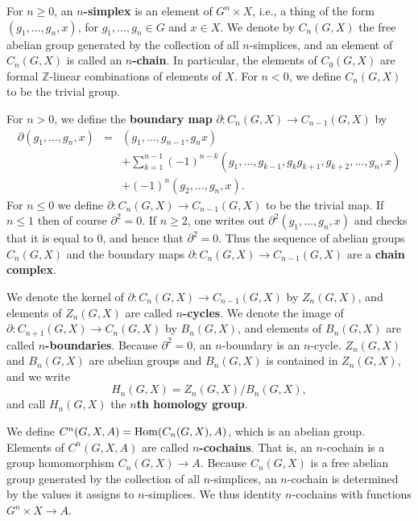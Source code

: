 \documentclass{article}
\newcommand{\Hom}{\ensuremath\mathrm{Hom}}
\theoremstyle{definition}
\begin{document}
For $n \geq 0$, an \textbf{$n$-simplex}
is an element of $G^n \times X$, i.e., 
a thing of the form $(g_1,\ldots,g_n,x)$, for $g_1,\ldots,g_n \in G$ and $x \in X$. 
We denote by $C_n(G,X)$  the free abelian group generated by the collection of all $n$-simplices, and an element of $C_n(G,X)$ is called an
\textbf{$n$-chain}.
In particular, the elements of $C_0(G,X)$ are formal $\mathbb{Z}$-linear combinations of elements 
of
$X$. For $n<0$, we define $C_n(G,X)$ to be the trivial group.

For $n>0$, we define the \textbf{boundary map} $\partial:C_n(G,X) \to C_{n-1}(G,X)$ by
\begin{eqnarray*}
\partial (g_1,\ldots,g_n,x) &=& (g_1,\ldots,g_{n-1},g_n x)\\
&&
+\sum_{k=1}^{n-1} (-1)^{n-k} (g_1,\ldots,g_{k-1},g_k g_{k+1},g_{k+2},\ldots,g_n,x)\\
&&+(-1)^n (g_2,\ldots,g_n,x).
\end{eqnarray*}
For $n \leq 0$ we define $\partial:C_n(G,X) \to C_{n-1}(G,X)$ to be the trivial map. If $n \leq 1$ then 
of course $\partial^2=0$. If $n \geq 2$,
 one writes out $\partial^2 (g_1,\ldots,g_n,x)$ and checks that it is equal to $0$, and hence that $\partial^2=0$.
Thus the sequence of abelian groups $C_n(G,X)$ and the boundary maps 
$\partial:C_n(G,X) \to C_{n-1}(G,X)$ are a \textbf{chain complex}. 

We denote the kernel of $\partial:C_n(G,X) \to C_{n-1}(G,X)$ by $Z_n(G,X)$, and elements of
$Z_n(G,X)$ are called \textbf{$n$-cycles}. We denote the image of $\partial:C_{n+1}(G,X) \to C_n(G,X)$
by $B_n(G,X)$, and elements of $B_n(G,X)$ are called \textbf{$n$-boundaries}. Because
$\partial^2=0$, an $n$-boundary is an $n$-cycle. 
$Z_n(G,X)$ and $B_n(G,X)$ are abelian groups and $B_n(G,X)$ is contained in $Z_n(G,X)$, and we write
\[
H_n(G,X) = Z_n(G,X) / B_n(G,X),
\]
and call $H_n(G,X)$ the \textbf{$n$th homology group}. 

We define $C^n(G,X,A) = \Hom(C_n(G,X),A)$, which is an abelian group.
 Elements of $C^n(G,X,A)$ are called 
 \textbf{$n$-cochains}.
 That is, an $n$-cochain is a group homomorphism
$C_n(G,X) \to A$. Because $C_n(G,X)$ is a free abelian group
generated by the collection of all $n$-simplices, an $n$-cochain is determined by the values it assigns to $n$-simplices. 
We thus identity $n$-cochains with functions $G^n \times X \to A$. 
\end{document}
